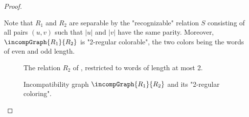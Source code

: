 \begin{proof}
\begin{example}
	Note that $R_1$ and $R_2$ are separable by the "recognizable" relation
	$S$ consisting of all pairs $(u,v)$ such that $|u|$ and $|v|$ have the same parity.
	Moreover, $\incompGraph{R_1}{R_2}$ is "2-regular colorable", the two colors being
	the words of even and odd length.
 \end{example}
 
\begin{figure}[htb]
	\centering
	\begin{tikzpicture}
		
	\end{tikzpicture}
	\caption{\AP\label{fig:equal_length_plusone-relation}%
		The relation $R_2$ of ,
		restricted to words of length at most 2.
	}
\end{figure}

\begin{figure}[htb]
	\centering
	\begin{tikzpicture}
		
	\end{tikzpicture}
	\caption{\AP\label{fig:equal_length_plusone-incompatibility}%
		Incompatibility graph $\incompGraph{R_1}{R_2}$ and its "2-regular coloring".
	}
 \end{figure}


\end{proof}
